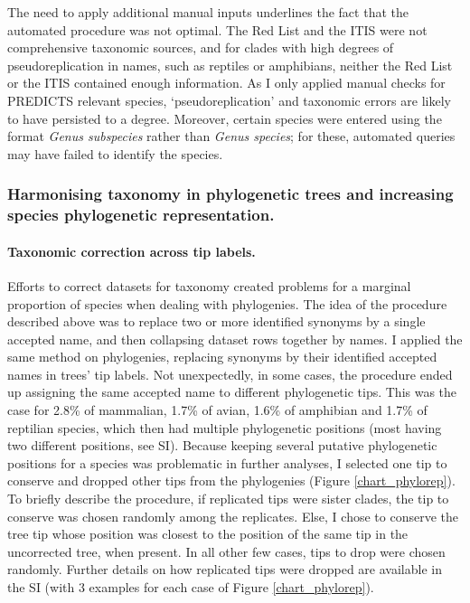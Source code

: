 The need to apply additional manual inputs underlines the fact that the automated procedure was not optimal. The Red List and the ITIS were not comprehensive taxonomic sources, and for clades with high degrees of pseudoreplication in names, such as reptiles or amphibians, neither the Red List or the ITIS contained enough information. As I only applied manual checks for PREDICTS relevant species, `pseudoreplication' and taxonomic errors are likely to have persisted to a degree. Moreover, certain species were entered using the format \textit{Genus subspecies} rather than \textit{Genus species}; for these, automated queries may have failed to identify the species.



\subsubsection{Harmonising taxonomy in phylogenetic trees and increasing species phylogenetic representation.}

\paragraph{Taxonomic correction across tip labels.} 
Efforts to correct datasets for taxonomy created problems for a marginal proportion of species when dealing with phylogenies. The idea of the procedure described above was to replace two or more identified synonyms by a single accepted name, and then collapsing dataset rows together by names. I applied the same method on phylogenies, replacing synonyms by their identified accepted names in trees' tip labels. Not unexpectedly, in some cases, the procedure ended up assigning the same accepted name to different phylogenetic tips. This was the case for 2.8\% of mammalian, 1.7\% of avian, 1.6\% of amphibian and  1.7\% of reptilian species, which then had multiple phylogenetic positions (most having two different positions, see SI). Because keeping several putative phylogenetic positions for a species was problematic in further analyses, I selected one tip to conserve and dropped other tips from the phylogenies (Figure \ref{chart_phylorep}). To briefly describe the procedure, if replicated tips were sister clades, the tip to conserve was chosen randomly among the replicates. Else, I chose to conserve the tree tip whose position was closest to the position of the same tip in the uncorrected tree, when present. In all other few cases, tips to drop were chosen randomly. Further details on how replicated tips were dropped are available in the SI (with 3 examples for each case of Figure \ref{chart_phylorep}).


